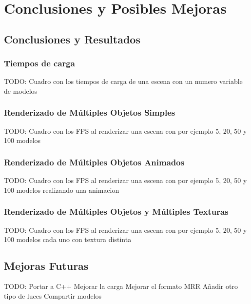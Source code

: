 
\chapter{Conclusiones y Posibles Mejoras} %

\label{Chapter4} %



\section{Conclusiones y Resultados}

\subsection{Tiempos de carga}
TODO: Cuadro con los tiempos de carga de una escena con un numero variable de modelos
\subsection{Renderizado de Múltiples Objetos Simples}
TODO: Cuadro con los FPS al renderizar una escena con por ejemplo
5, 20, 50 y 100 modelos
\subsection{Renderizado de Múltiples Objetos Animados}
TODO: Cuadro con los FPS al renderizar una escena con por ejemplo
5, 20, 50 y 100 modelos realizando una animacion
\subsection{Renderizado de Múltiples Objetos y Múltiples Texturas}
TODO: Cuadro con los FPS al renderizar una escena con por ejemplo
5, 20, 50 y 100 modelos cada uno con textura distinta


\section{Mejoras Futuras}
TODO: 
Portar a C++
Mejorar la carga
Mejorar el formato MRR
Añadir otro tipo de luces
Compartir modelos